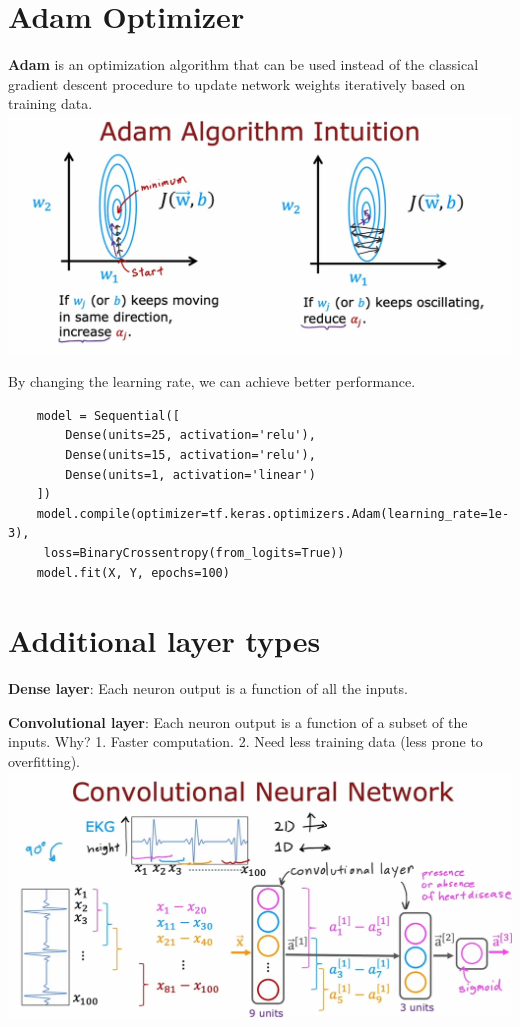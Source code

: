 \section{Adam Optimizer}
\textbf{Adam} is an optimization algorithm that can be used instead of the classical 
gradient descent procedure to update network weights iteratively based on training data.\\
\includegraphics*[width=\textwidth]{images/9.2}\par
By changing the learning rate, we can achieve better performance.\par
\begin{verbatim}
    model = Sequential([
        Dense(units=25, activation='relu'),
        Dense(units=15, activation='relu'),
        Dense(units=1, activation='linear')
    ])
    model.compile(optimizer=tf.keras.optimizers.Adam(learning_rate=1e-3),
     loss=BinaryCrossentropy(from_logits=True))
    model.fit(X, Y, epochs=100)
\end{verbatim}

\section{Additional layer types}
\textbf{Dense layer}: Each neuron output is a function of all the inputs.\par
\textbf{Convolutional layer}: Each neuron output is a function of a subset of the inputs.
Why? 1. Faster computation. 2. Need less training data (less prone to overfitting).\\
\includegraphics*[width=\textwidth]{images/9.3}

